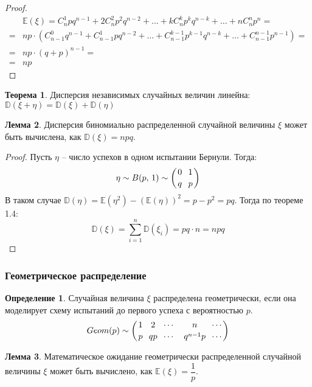 \documentclass[12pt]{article}
\theoremstyle{definition}
\newtheorem{theorem}{Теорема}[section]
\newtheorem{lemma}[theorem]{Лемма}
\newtheorem{definition}{Определение}
\newcommand{\E}{\mathbb{E}}
\newcommand{\D}{\mathbb{D}}
\begin{document}
\begin{proof}
    \begin{align*}
        &\E(\xi) = C_n^1pq^{n-1} + 2C_n^2p^2q^{n-2} + \ldots + kC_n^kp^kq^{n-k} + \ldots + nC_n^np^n = \\
        =& np \cdot (C_{n-1}^0q^{n-1} + C_{n-1}^1pq^{n-2}+\ldots + C_{n-1}^{k-1}p^{k-1}q^{n-k} + \ldots + C_{n-1}^{n-1}p^{n-1})=\\
        =& np \cdot (q+p)^{n-1}=\\
        =& np
    \end{align*}
\end{proof}

\begin{theorem}
    Дисперсия независимых случайных величин линейна: $\D(\xi+\eta)=\D(\xi)+\D(\eta)$
\end{theorem}

\begin{lemma}
    Дисперсия биномиально распределенной случайной величины $\xi$ может быть вычислена, как $\D(\xi)=npq$.
\end{lemma}

\begin{proof}
    Пусть $\eta$ -- число успехов в одном испытании Бернули. Тогда:
    $$\eta \sim B(p,\,1) \sim \left(\genfrac{}{}{0pt}{0}{0}{q} \,\,\, \genfrac{}{}{0pt}{0}{1}{p}\right)$$
    В таком случае $\D(\eta)=\E(\eta^2)-(\E(\eta))^2=p-p^2=pq$. Тогда по теореме 1.4:
    $$\D(\xi)=\sum_{i=1}^{n}\D(\xi_i)=pq \cdot n = npq$$
\end{proof}

\subsubsection{Геометрическое распределение}

\begin{definition}
    Случайная величина $\xi$ распределена геометрически, если она моделирует схему испытаний до первого успеха с вероятностью $p$.
    $$Geom(p) \sim \left( \genfrac{}{}{0pt}{0}{1}{p} \,\,\, \genfrac{}{}{0pt}{0}{2}{qp} \,\,\, \genfrac{}{}{0pt}{0}{\cdots}{\cdots} \,\,\, \,\,\, \genfrac{}{}{0pt}{0}{n}{q^{n-1}p} \,\,\, \genfrac{}{}{0pt}{0}{\cdots}{\cdots}\right)$$
\end{definition}

\begin{lemma}
    Математическое ожидание геометрически распределенной случайной величины $\xi$ может быть вычислено, как $\E(\xi)=\dfrac{1}{p}$.
\end{lemma}
\end{document}
